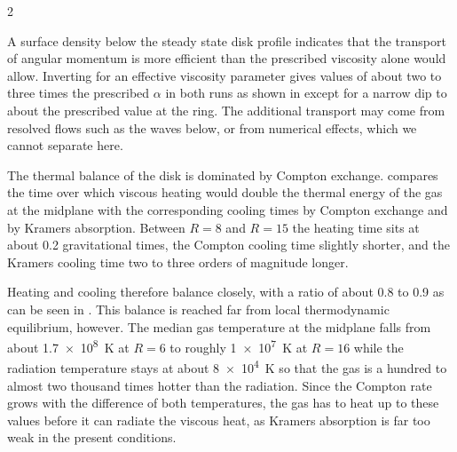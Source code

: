 \begin{multicols}{2}


	A surface density below the steady state disk profile indicates that the transport of angular momentum is more efficient than the
	prescribed viscosity alone would allow. Inverting  for an effective viscosity parameter gives values of about
	two to three times the prescribed $\alpha$ in both runs as shown in  except for a narrow dip to about the
	prescribed value at the ring. The additional transport may come from resolved flows such as the waves below, or from
	numerical effects, which we cannot separate here.\vspace{0.25em}


	The thermal balance of the disk is dominated by Compton exchange.  compares the time over which viscous
	heating would double the thermal energy of the gas at the midplane with the corresponding cooling times by Compton exchange and
	by Kramers absorption. Between $R = 8$ and $R = 15$ the heating time sits at about \num{0.2} gravitational times, the Compton
	cooling time slightly shorter, and the Kramers cooling time two to three orders of magnitude longer.


	Heating and cooling therefore balance closely, with a ratio of about \num{0.8} to \num{0.9} as can be seen in .
	This balance is reached far from local thermodynamic equilibrium, however. The median gas temperature at the midplane falls
	from about \qty{1.7e8}{\kelvin} at $R = 6$ to roughly \qty{1e7}{\kelvin} at $R = 16$ while the radiation temperature stays at
	about \qty{8e4}{\kelvin} so that the gas is a hundred to almost two thousand times hotter than the radiation. Since the
	Compton rate grows with the difference of both temperatures, the gas has to heat up to these values before it can radiate the
	viscous heat, as Kramers absorption is far too weak in the present conditions.


\end{multicols}
